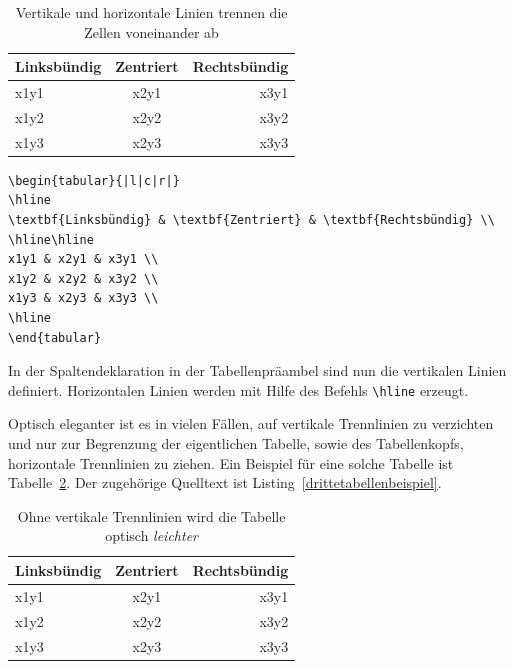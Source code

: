 \documentclass[a4paper,10pt,twoside]{scrbook}
\begin{document}
\begin{table}[h!tb]
\centering
\caption{Vertikale und horizontale Linien trennen die Zellen voneinander ab}
\label{Tabelle_Spaltenformatierungseintrag2}
\begin{tabular}{|l|c|r|}
\hline
\textbf{Linksbündig} & \textbf{Zentriert} & \textbf{Rechtsbündig} \\
\hline\hline
x1y1 & x2y1 & x3y1 \\
x1y2 & x2y2 & x3y2 \\
x1y3 & x2y3 & x3y3 \\
\hline
\end{tabular}
\end{table}



\begin{lstlisting}[caption={Vertikale und horizontale Linien grenzen die Zellen der Tabelle voneinander ab},label=zweitestabellenbeispiel, style=customlatex]
\begin{tabular}{|l|c|r|}
\hline
\textbf{Linksbündig} & \textbf{Zentriert} & \textbf{Rechtsbündig} \\
\hline\hline
x1y1 & x2y1 & x3y1 \\
x1y2 & x2y2 & x3y2 \\
x1y3 & x2y3 & x3y3 \\
\hline
\end{tabular}
\end{lstlisting}

In der Spaltendeklaration in der Tabellenpräambel sind nun die vertikalen Linien definiert.
Horizontalen Linien werden mit Hilfe des Befehls \verb!\hline! erzeugt.

Optisch eleganter ist es in vielen Fällen, auf vertikale Trennlinien zu verzichten und
nur zur Begrenzung der eigentlichen Tabelle, sowie des Tabellenkopfs, horizontale Trennlinien zu ziehen. 
Ein Beispiel für eine solche Tabelle ist Tabelle~\ref{Tabelle_Spaltenformatierungseintrag3}. Der zugehörige Quelltext ist Listing~\ref{drittetabellenbeispiel}. 



\begin{table}[h!tb]
\centering
\caption{Ohne vertikale Trennlinien wird die Tabelle optisch \emph{leichter}}
\label{Tabelle_Spaltenformatierungseintrag3}
\begin{tabular}{lcr}
\hline
\textbf{Linksbündig} & \textbf{Zentriert} & \textbf{Rechtsbündig} \\
\hline
x1y1 & x2y1 & x3y1 \\
x1y2 & x2y2 & x3y2 \\
x1y3 & x2y3 & x3y3 \\
\hline
\end{tabular}
\end{table}
\end{document}
